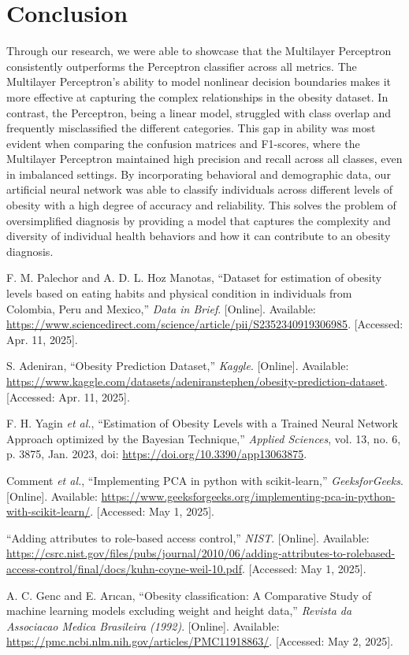 \documentclass[conference]{IEEEtran}
\begin{document}
\section{Conclusion}
Through our research, we were able to showcase that the Multilayer Perceptron consistently outperforms the Perceptron classifier across all metrics. The Multilayer Perceptron’s ability to model nonlinear decision boundaries makes it more effective at capturing the complex relationships in the obesity dataset. In contrast, the Perceptron, being a linear model, struggled with class overlap and frequently misclassified the different categories. This gap in ability was most evident when comparing the confusion matrices and F1-scores, where the Multilayer Perceptron maintained high precision and recall across all classes, even in imbalanced settings. By incorporating behavioral and demographic data, our artificial neural network was able to classify individuals across different levels of obesity with a high degree of accuracy and reliability. This solves the problem of oversimplified diagnosis by providing a model that captures the complexity and diversity of individual health behaviors and how it can contribute to an obesity diagnosis.


\begin{thebibliography}{00}

 F. M. Palechor and A. D. L. Hoz Manotas, ``Dataset for estimation of obesity levels based on eating habits and physical condition in individuals from Colombia, Peru and Mexico,'' \textit{Data in Brief}. [Online]. Available: \url{https://www.sciencedirect.com/science/article/pii/S2352340919306985}. [Accessed: Apr. 11, 2025].

 S. Adeniran, ``Obesity Prediction Dataset,'' \textit{Kaggle}. [Online]. Available: \url{https://www.kaggle.com/datasets/adeniranstephen/obesity-prediction-dataset}. [Accessed: Apr. 11, 2025].

 F. H. Yagin \textit{et al.}, ``Estimation of Obesity Levels with a Trained Neural Network Approach optimized by the Bayesian Technique,'' \textit{Applied Sciences}, vol. 13, no. 6, p. 3875, Jan. 2023, doi: \url{https://doi.org/10.3390/app13063875}.

 Comment \textit{et al.}, ``Implementing PCA in python with scikit-learn,'' \textit{GeeksforGeeks}. [Online]. Available: \url{https://www.geeksforgeeks.org/implementing-pca-in-python-with-scikit-learn/}. [Accessed: May 1, 2025].

 ``Adding attributes to role-based access control,'' \textit{NIST}. [Online]. Available: \url{https://csrc.nist.gov/files/pubs/journal/2010/06/adding-attributes-to-rolebased-access-control/final/docs/kuhn-coyne-weil-10.pdf}. [Accessed: May 1, 2025].

 A. C. Genc and E. Arıcan, ``Obesity classification: A Comparative Study of machine learning models excluding weight and height data,'' \textit{Revista da Associacao Medica Brasileira (1992)}. [Online]. Available: \url{https://pmc.ncbi.nlm.nih.gov/articles/PMC11918863/}. [Accessed: May 2, 2025].
\end{thebibliography}
\end{document}
